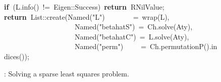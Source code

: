 \documentclass[shortnames,article,nojss]{jss}
\newcommand{\hlstd}[1]{\textcolor[rgb]{0,0,0}{#1}}
\newcommand{\hlopt}[1]{\textcolor[rgb]{0,0,0}{#1}}
\newcommand{\hlstr}[1]{\textcolor[rgb]{0.90,0.15,0.15}{#1}}
\newcommand{\hlkwa}[1]{\textcolor[rgb]{0.61,0.13,0.93}{\bf{#1}}}
\newcommand{\hlkwd}[1]{\textcolor[rgb]{0,0,0}{#1}}
\begin{document}
\begin{figure}[htb]
    \hlstd{}\hlkwa{if\ }\hlstd{}\hlopt{(}\hlstd{L}\hlopt{.}\hlstd{}\hlkwd{info}\hlstd{}\hlopt{()\ !=\ }\hlstd{Eigen}\hlopt{::}\hlstd{Success}\hlopt{)\ }\hlstd{}\hlkwa{return\ }\hlstd{R\textunderscore NilValue}\hlopt{;}\hspace*{\fill}\\
    \hlstd{}\hlkwa{return\ }\hlstd{List}\hlopt{::}\hlstd{}\hlkwd{create}\hlstd{}\hlopt{(}\hlstd{Named}\hlopt{{(}}\hlstd{}\hlstr{"L"}\hlstd{}\hlopt{{)}}\hlstd{\ \ \ \ \ \ \ \ }\hlopt{=\ }\hlstd{}\hlkwd{wrap}\hlstd{}\hlopt{(}\hlstd{L}\hlopt{),}\hspace*{\fill}\\
    \hlstd{}\hlstd{\ \ \ \ \ \ \ \ \ \ \ \ \ \ \ \ \ \ \ \ }\hlstd{Named}\hlopt{{(}}\hlstd{}\hlstr{"betahatS"}\hlstd{}\hlopt{{)}\ =\ }\hlstd{Ch}\hlopt{.}\hlstd{}\hlkwd{solve}\hlstd{}\hlopt{(}\hlstd{Aty}\hlopt{),}\hspace*{\fill}\\
    \hlstd{}\hlstd{\ \ \ \ \ \ \ \ \ \ \ \ \ \ \ \ \ \ \ \ }\hlstd{Named}{{(}}\hlstd{}\hlstr{"betahatC"}\hlstd{}\hlopt{{)}\ =\ }\hlstd{L}\hlopt{.}\hlstd{}\hlkwd{solve}\hlstd{}\hlopt{(}\hlstd{Aty}\hlopt{),}\hspace*{\fill}\\
    \hlstd{}\hlstd{\ \ \ \ \ \ \ \ \ \ \ \ \ \ \ \ \ \ \ \ }\hlstd{Named}\hlopt{{(}}\hlstd{}\hlstr{"perm"}\hlstd{}\hlopt{{)}}\hlstd{\ \ \ \ \ }\hlopt{=\ }\hlstd{Ch}\hlopt{.}\hlstd{}\hlkwd{permutationP}\hlstd{}\hlopt{().}\hlstd{}\hlkwd{indices}\hlstd{}\hlopt{());}\hlstd{}\hspace*{\fill}\\
    \mbox{}
    \normalfont
    \normalsize
  \caption{: Solving a sparse least squares problem.}
  \label{fig:spLS}
\end{figure}
\end{document}
